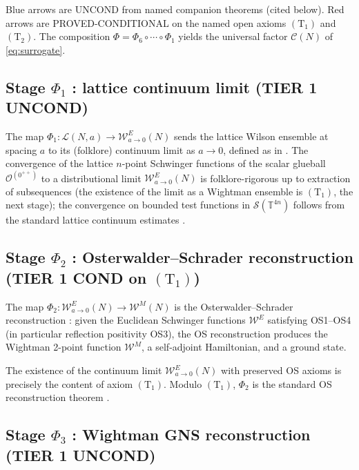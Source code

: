 \documentclass[11pt,a4paper,reqno]{amsart}
\theoremstyle{definition}
\newcommand{\TT}{\mathbb{T}}
\newcommand{\Phii}[1]{\Phi_{#1}}
\newcommand{\Cone}{(\mathrm{T}_{1})}
\newcommand{\Ctwo}{(\mathrm{T}_{2})}
\begin{document}
Blue arrows are UNCOND from named companion theorems (cited below).
Red arrows are PROVED-CONDITIONAL on the named open axioms $\Cone$
and $\Ctwo$. The composition $\Phi = \Phii{6}\circ\cdots\circ\Phii{1}$
yields the universal factor $\mathcal{C}(N)$ of \eqref{eq:surrogate}.

\subsection{Stage $\Phii{1}$ : lattice continuum limit (TIER 1 UNCOND)}\label{ss:phi1}

The map $\Phii{1} : \mathcal{L}(N,a)\to\mathcal{W}^E_{a\to 0}(N)$
sends the lattice Wilson ensemble at spacing $a$ to its (folklore)
continuum limit as $a\to 0$, defined as in \cite[\S 6.1]{GlimmJaffe1981}.
The convergence of the lattice $n$-point Schwinger functions of the
scalar glueball $\mathcal{O}^{(0^{++})}$ to a distributional limit
$\mathcal{W}^E_{a\to 0}(N)$ is folklore-rigorous up to extraction of
subsequences (the existence of the limit as a Wightman ensemble is
$\Cone$, the next stage); the convergence on bounded test functions
in $\mathcal{S}(\TT^{4n})$ follows from the standard lattice continuum
estimates \cite[\S 6]{GlimmJaffe1981}.

\subsection{Stage $\Phii{2}$ : Osterwalder--Schrader reconstruction (TIER 1
  COND on $\Cone$)}\label{ss:phi2}

The map $\Phii{2} : \mathcal{W}^E_{a\to 0}(N)\to\mathcal{W}^M(N)$ is
the Osterwalder--Schrader reconstruction
\cite{OsterwalderSchrader1973,OsterwalderSchrader1975}: given the
Euclidean Schwinger functions $\mathcal{W}^E$ satisfying OS1--OS4 (in
particular reflection positivity OS3), the OS reconstruction produces
the Wightman 2-point function $\mathcal{W}^M$, a self-adjoint
Hamiltonian, and a ground state.

The existence of the continuum limit $\mathcal{W}^E_{a\to 0}(N)$ with
preserved OS axioms is precisely the content of axiom $\Cone$. Modulo
$\Cone$, $\Phii{2}$ is the standard OS reconstruction theorem
\cite[Thm.~2.1]{OsterwalderSchrader1973}.

\subsection{Stage $\Phii{3}$ : Wightman GNS reconstruction (TIER 1 UNCOND)}\label{ss:phi3}
\end{document}
